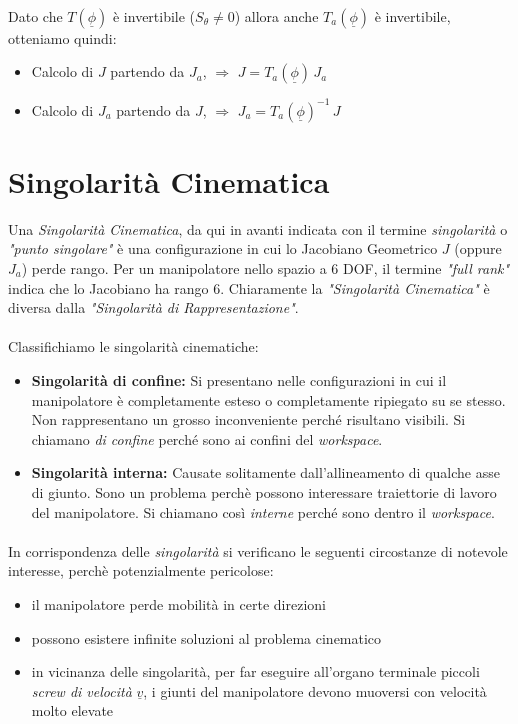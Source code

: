 \paragraph{}
Dato che $T(\underline{\phi})$ è invertibile ($S_{\theta} \neq 0$) allora anche $T_a(\underline{\phi})$ è invertibile, otteniamo quindi:
\begin{itemize}
	\item Calcolo di $J$ partendo da $J_a$, $\Rightarrow$ $J = T_a(\underline{\phi})\,J_a$
	\item Calcolo di $J_a$ partendo da $J$, $\Rightarrow$ $J_a = T_a(\underline{\phi})^{-1}\,J$ 
\end{itemize}

\section{Singolarità Cinematica}
Una \emph{Singolarità Cinematica}, da qui in avanti indicata con il termine \emph{singolarità} o \emph{"punto singolare"} è una configurazione in cui lo Jacobiano Geometrico $J$ (oppure $J_a$) perde rango. Per un manipolatore nello spazio a 6 DOF, il termine \emph{"full rank"} indica che lo Jacobiano ha rango 6. Chiaramente la \emph{"Singolarità Cinematica"} è diversa dalla \emph{"Singolarità di Rappresentazione"}. 
\paragraph{}
Classifichiamo le singolarità cinematiche:
\begin{itemize}
	\item \textbf{Singolarità di confine:} Si presentano nelle configurazioni in cui il manipolatore è completamente esteso o completamente ripiegato su se stesso. Non rappresentano un grosso inconveniente perché risultano visibili. Si chiamano \emph{di confine} perché sono ai confini del \emph{workspace}.
	\item \textbf{Singolarità interna:} Causate solitamente dall’allineamento di qualche asse di giunto. Sono un problema perchè possono interessare traiettorie di lavoro del manipolatore. Si chiamano così \emph{interne} perché sono dentro il \emph{workspace}.
\end{itemize}
\paragraph{}
In corrispondenza delle \emph{singolarità} si verificano le seguenti circostanze di notevole interesse, perchè potenzialmente pericolose:
\begin{itemize}
	\item il manipolatore perde mobilità in certe direzioni
	\item possono esistere infinite soluzioni al problema cinematico
	\item in vicinanza delle singolarità, per far eseguire all'organo terminale piccoli \emph{screw di velocità} $\underline{v}$, i giunti del manipolatore devono muoversi con velocità molto elevate
\end{itemize} 


